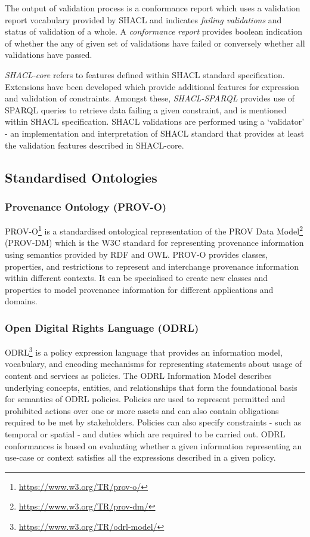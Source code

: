 The output of validation process is a conformance report which uses a validation report vocabulary provided by SHACL and indicates \textit{failing validations} and status of validation of a whole. A \textit{conformance report} provides boolean indication of whether the any of given set of validations have failed or conversely whether all validations have passed.

\textit{SHACL-core} refers to features defined within SHACL standard specification. Extensions have been developed which provide additional features for expression and validation of constraints. Amongst these, \textit{SHACL-SPARQL} provides use of SPARQL queries to retrieve data failing a given constraint, and is mentioned within SHACL specification.
SHACL validations are performed using a `validator' - an implementation and interpretation of SHACL standard that provides at least the validation features described in SHACL-core.

\subsection{Standardised Ontologies}
\subsubsection{Provenance Ontology (PROV-O)}
PROV-O\footnote{\url{https://www.w3.org/TR/prov-o/}} is a standardised ontological representation of the PROV Data Model\footnote{\url{https://www.w3.org/TR/prov-dm/}} (PROV-DM) which is the W3C standard for representing provenance information using semantics provided by RDF and OWL.
PROV-O provides classes, properties, and restrictions to represent and interchange provenance information within different contexts.
It can be specialised to create new classes and properties to model provenance information for different applications and domains.

\subsubsection{Open Digital Rights Language (ODRL)}
ODRL\footnote{\url{https://www.w3.org/TR/odrl-model/}} is a policy expression language that provides an information model, vocabulary, and encoding mechanisms for representing statements about usage of content and services as policies. The ODRL Information Model describes underlying concepts, entities, and relationships that form the foundational basis for semantics of ODRL policies.
Policies are used to represent permitted and prohibited actions over one or more assets and can also contain obligations required to be met by stakeholders.
Policies can also specify constraints - such as temporal or spatial - and duties which are required to be carried out.
ODRL conformances is based on evaluating whether a given information representing an use-case or context satisfies all the expressions described in a given policy.